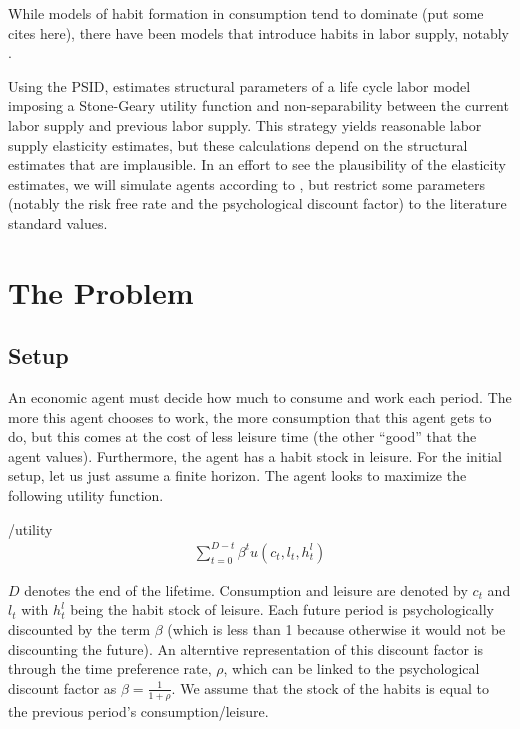 \documentclass[ProjectMMD]{subfiles}
\begin{document}
While models of habit formation in consumption tend to dominate (put some cites here), there have been models that introduce habits in labor supply, notably \cite{bover1991relaxing}.

Using the PSID, \cite{bover1991relaxing} estimates structural parameters of a life cycle labor model imposing a Stone-Geary utility function and non-separability between the current labor supply and previous labor supply. This strategy yields reasonable labor supply elasticity estimates, but these calculations depend on the structural estimates that are implausible. In an effort to see the plausibility of the elasticity estimates, we will simulate agents according to \cite{bover1991relaxing}, but restrict some parameters (notably the risk free rate and the psychological discount factor) to the literature standard values.


\section{The Problem}

\subsection{Setup}\label{subsec:Setup}
An economic agent must decide how much to consume and work each period. The more this agent chooses to work, the more consumption that this agent gets to do, but this comes at the cost of less leisure time (the other ``good'' that the agent values). Furthermore, the agent has a habit stock in leisure. For the initial setup, let us just assume a finite horizon. The agent looks to maximize the following utility function.
\hypertarget{utility}{}
\begin{verbatimwrite}{\EqDir/utility}
  \begin{align}
    \sum_{t=0}^{D-t}\beta^t u(c_t, l_t, h_t^l)
  \end{align}
\end{verbatimwrite}


$D$ denotes the end of the lifetime. Consumption and leisure are denoted by $c_t$ and $l_t$ with $h_t^l$ being the habit stock of leisure. Each future period is psychologically discounted by the term $\beta$ (which is less than 1 because otherwise it would not be discounting the future). An alterntive representation of this discount factor is through the time preference rate, $\rho$, which can be linked to the psychological discount factor as $\beta = \frac{1}{1+\rho}$. We assume that the stock of the habits is equal to the previous period's consumption/leisure.
\end{document}
